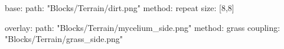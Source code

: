 base:
  path: "Blocks/Terrain/dirt.png"
  method: repeat
  size: [8,8]

overlay:
  path: "Blocks/Terrain/mycelium_side.png"
  method: grass
  coupling: "Blocks/Terrain/grass_side.png"